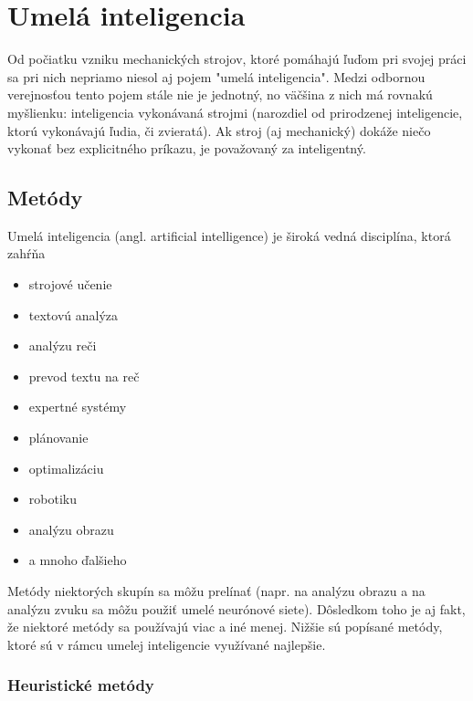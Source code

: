 \section{Umelá inteligencia}\label{sec:ai}

Od počiatku vzniku mechanických strojov, ktoré pomáhajú ľuďom pri svojej práci sa pri nich nepriamo niesol aj pojem
"umelá inteligencia".
Medzi odbornou verejnosťou tento pojem stále nie je jednotný, no väčšina z nich má rovnakú myšlienku:
inteligencia vykonávaná strojmi (narozdiel od prirodzenej inteligencie, ktorú vykonávajú ľudia, či zvieratá).
Ak stroj (aj mechanický) dokáže niečo vykonať bez explicitného príkazu, je považovaný za inteligentný.

\subsection{Metódy}\label{subsec:ai-methods}

Umelá inteligencia (angl. artificial intelligence) je široká vedná disciplína, ktorá zahŕňa
\begin{itemize}
    \item strojové učenie
    \item textovú analýza
    \item analýzu reči
    \item prevod textu na reč
    \item expertné systémy
    \item plánovanie
    \item optimalizáciu
    \item robotiku
    \item analýzu obrazu
    \item a mnoho ďalšieho
\end{itemize}
Metódy niektorých skupín sa môžu prelínať (napr. na analýzu obrazu a na analýzu zvuku sa môžu použiť umelé neurónové
siete).
Dôsledkom toho je aj fakt, že niektoré metódy sa používajú viac a iné menej.
Nižšie sú popísané metódy, ktoré sú v rámcu umelej inteligencie využívané najlepšie.

\subsubsection{Heuristické metódy}

